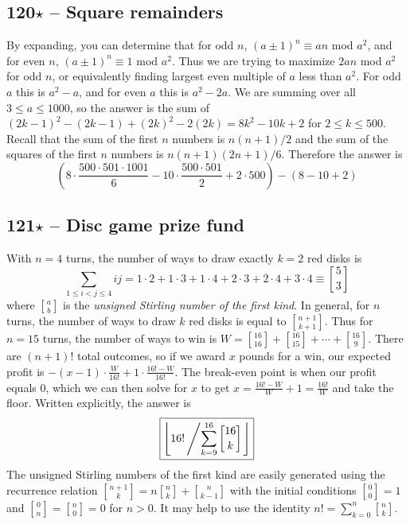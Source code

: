 \documentclass{article}
\newcommand{\stirling}[2]{\genfrac{[}{]}{0pt}{}{#1}{#2}}
\begin{document}
\subsection*{120$\star$ -- Square remainders} 
By expanding, you can determine that for odd $n$, $(a \pm 1)^n \equiv an$ mod $a^2$, and for even $n$, $(a \pm 1)^n \equiv 1$ mod $a^2$. 
Thus we are trying to maximize $2an$ mod $a^2$ for odd $n$, or equivalently finding largest even multiple of $a$ less than $a^2$. 
For odd $a$ this is $a^2 - a$, and for even $a$ this is $a^2 - 2a$. 
We are summing over all $3 \leq a \leq 1000$, so the answer is the sum of $(2k-1)^2 - (2k-1) + (2k)^2 - 2(2k) = 8k^2 - 10k + 2$ for $2 \leq k \leq 500$. 
Recall that the sum of the first $n$ numbers is $n(n+1)/2$ and the sum of the squares of the first $n$ numbers is $n(n+1)(2n+1)/6$. 
Therefore the answer is
$$\boxed{ \left(8\cdot\frac{500\cdot501\cdot1001}{6} - 10\cdot\frac{500\cdot501}{2} + 2\cdot500\right) - (8-10+2) }$$

\subsection*{121$\star$ -- Disc game prize fund}  
With $n=4$ turns, the number of ways to draw exactly $k=2$ red disks is 
\[ \sum_{1 \leq i < j \leq 4} i j = 1\cdot2 + 1\cdot3 + 1\cdot4 + 2\cdot3 + 2\cdot4 + 3\cdot4 \equiv \stirling{5}{3} \]
where $\stirling{a}{b}$ is the \emph{unsigned Stirling number of the first kind}.
In general, for $n$ turns, the number of ways to draw $k$ red disks is equal to $\stirling{n+1}{k+1}$.
Thus for $n = 15$ turns, the number of ways to win is $W = \stirling{16}{16} + \stirling{16}{15} + \cdots + \stirling{16}{9}$. 
There are $(n+1)!$ total outcomes, so if we award $x$ pounds for a win, our expected profit is $-(x-1)\cdot\frac{W}{16!} + 1\cdot\frac{16!-W}{16!}$. 
The break-even point is when our profit equals 0, which we can then solve for $x$ to get $x = \frac{16!-W}{W}+1 = \frac{16!}{W}$ and take the floor. 
Written explicitly, the answer is
$$\boxed{ \left\lfloor16! \left/ \sum_{k=9}^{16} \stirling{16}{k} \right. \right\rfloor}$$ 
The unsigned Stirling numbers of the first kind are easily generated using the recurrence relation $\stirling{n+1}{k} = n\stirling{n}{k} + \stirling{n}{k-1}$ with the initial conditions $\stirling{0}{0} = 1$ and $\stirling{0}{n} = \stirling{n}{0} = 0$ for $n > 0$. 
It may help to use the identity $n! = \sum_{k=0}^n \stirling{n}{k}$.
\end{document}
